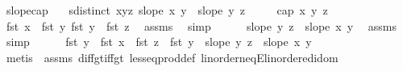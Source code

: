 \begin{isabellebody}
\endisatagproof
{\isafoldproof}%
%
\isadelimproof
%
\endisadelimproof
\isanewline
\isanewline
{}\isamarkupfalse%
\ slope{\isacharunderscore}{\kern0pt}cap{}{\isacharcolon}{\kern0pt}\isanewline
\ \ \ {\isachardoublequoteopen}sdistinct\ {\isacharbrackleft}{\kern0pt}x{\isacharcomma}{\kern0pt}y{\isacharcomma}{\kern0pt}z{\isacharbrackright}{\kern0pt}{\isachardoublequoteclose}\ {\isachardoublequoteopen}slope\ x\ y\ {\isachargreater}{\kern0pt}\ slope\ y\ z{\isachardoublequoteclose}\isanewline
\ \ \ \ \ {\isachardoublequoteopen}cap{}\ x\ y\ z{\isachardoublequoteclose}\isanewline
%
\isadelimproof
%
\endisadelimproof
%
\isatagproof
{}\isamarkupfalse%
{\isacharminus}{\kern0pt}\isanewline
\ \ \isamarkupfalse%
\ {}{\isacharcolon}{\kern0pt}{\isachardoublequoteopen}fst\ x\ {\isasymnoteq}\ fst\ y{\isachardoublequoteclose}\ {\isachardoublequoteopen}fst\ y\ {\isasymnoteq}\ fst\ z{\isachardoublequoteclose}\ \isamarkupfalse%
\ assms{\isacharparenleft}{\kern0pt}{}{\isacharparenright}{\kern0pt}\ \isamarkupfalse%
\ simp{\isacharplus}{\kern0pt}\isanewline
\ \ \isamarkupfalse%
\ {\isachardoublequoteopen}{}\ {\isachargreater}{\kern0pt}\ slope\ y\ z\ {\isacharminus}{\kern0pt}\ slope\ x\ y{\isachardoublequoteclose}\ \isamarkupfalse%
\ assms{\isacharparenleft}{\kern0pt}{}{\isacharparenright}{\kern0pt}\ \isamarkupfalse%
\ simp\isanewline
\ \ \isamarkupfalse%
\ {\isachardoublequoteopen}{}\ {\isachargreater}{\kern0pt}\ {\isacharparenleft}{\kern0pt}fst\ y\ {\isacharminus}{\kern0pt}\ fst\ x{\isacharparenright}{\kern0pt}\ {\isacharasterisk}{\kern0pt}\ {\isacharparenleft}{\kern0pt}fst\ z\ {\isacharminus}{\kern0pt}\ fst\ y{\isacharparenright}{\kern0pt}\ {\isacharasterisk}{\kern0pt}\ {\isacharparenleft}{\kern0pt}slope\ y\ z\ {\isacharminus}{\kern0pt}\ slope\ x\ y{\isacharparenright}{\kern0pt}{\isachardoublequoteclose}\isanewline
\ \ \ \ \isamarkupfalse%
\ {\isacharparenleft}{\kern0pt}metis\ {\isachardoublequoteopen}{}{\isachardoublequoteclose}{\isacharparenleft}{\kern0pt}{}{\isacharcomma}{\kern0pt}{}{\isacharparenright}{\kern0pt}\ assms{\isacharparenleft}{\kern0pt}{}{\isacharparenright}{\kern0pt}\ diff{\isacharunderscore}{\kern0pt}gt{\isacharunderscore}{\kern0pt}{}{\isacharunderscore}{\kern0pt}iff{\isacharunderscore}{\kern0pt}gt\ less{\isacharunderscore}{\kern0pt}eq{\isacharunderscore}{\kern0pt}prod{\isacharunderscore}{\kern0pt}def\ linorder{\isacharunderscore}{\kern0pt}neqE{\isacharunderscore}{\kern0pt}linordered{\isacharunderscore}{\kern0pt}idom\isanewline

\end{isabellebody}
